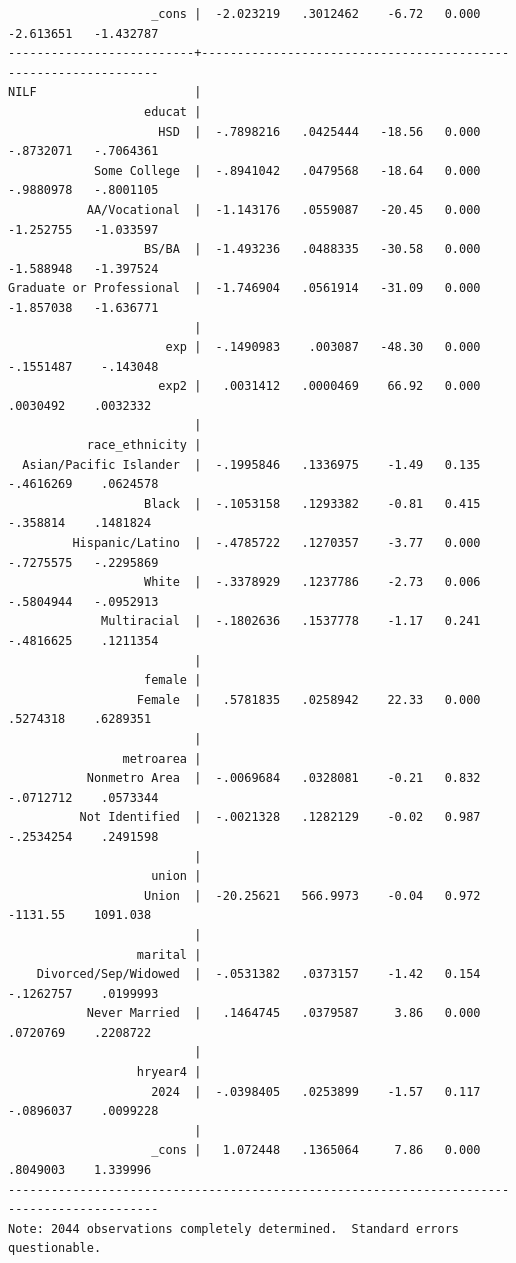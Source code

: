 \documentclass[
]{book}
\begin{document}
\begin{verbatim}
                    _cons |  -2.023219   .3012462    -6.72   0.000    -2.613651   -1.432787
--------------------------+----------------------------------------------------------------
NILF                      |
                   educat |
                     HSD  |  -.7898216   .0425444   -18.56   0.000    -.8732071   -.7064361
            Some College  |  -.8941042   .0479568   -18.64   0.000    -.9880978   -.8001105
           AA/Vocational  |  -1.143176   .0559087   -20.45   0.000    -1.252755   -1.033597
                   BS/BA  |  -1.493236   .0488335   -30.58   0.000    -1.588948   -1.397524
Graduate or Professional  |  -1.746904   .0561914   -31.09   0.000    -1.857038   -1.636771
                          |
                      exp |  -.1490983    .003087   -48.30   0.000    -.1551487    -.143048
                     exp2 |   .0031412   .0000469    66.92   0.000     .0030492    .0032332
                          |
           race_ethnicity |
  Asian/Pacific Islander  |  -.1995846   .1336975    -1.49   0.135    -.4616269    .0624578
                   Black  |  -.1053158   .1293382    -0.81   0.415     -.358814    .1481824
         Hispanic/Latino  |  -.4785722   .1270357    -3.77   0.000    -.7275575   -.2295869
                   White  |  -.3378929   .1237786    -2.73   0.006    -.5804944   -.0952913
             Multiracial  |  -.1802636   .1537778    -1.17   0.241    -.4816625    .1211354
                          |
                   female |
                  Female  |   .5781835   .0258942    22.33   0.000     .5274318    .6289351
                          |
                metroarea |
           Nonmetro Area  |  -.0069684   .0328081    -0.21   0.832    -.0712712    .0573344
          Not Identified  |  -.0021328   .1282129    -0.02   0.987    -.2534254    .2491598
                          |
                    union |
                   Union  |  -20.25621   566.9973    -0.04   0.972     -1131.55    1091.038
                          |
                  marital |
    Divorced/Sep/Widowed  |  -.0531382   .0373157    -1.42   0.154    -.1262757    .0199993
           Never Married  |   .1464745   .0379587     3.86   0.000     .0720769    .2208722
                          |
                  hryear4 |
                    2024  |  -.0398405   .0253899    -1.57   0.117    -.0896037    .0099228
                          |
                    _cons |   1.072448   .1365064     7.86   0.000     .8049003    1.339996
-------------------------------------------------------------------------------------------
Note: 2044 observations completely determined.  Standard errors questionable.
\end{verbatim}
\end{document}
